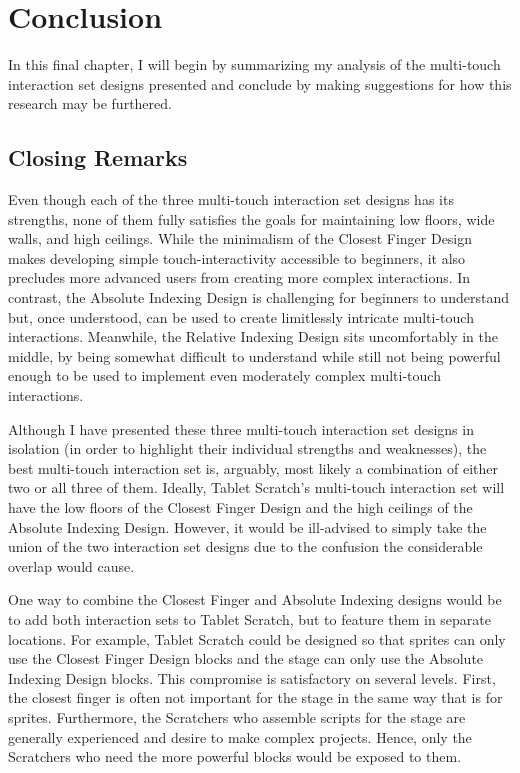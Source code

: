 \chapter{Conclusion}

In this final chapter, I will begin by summarizing my analysis of the multi-touch interaction set designs presented and conclude by making suggestions for how this research may be furthered.

\section{Closing Remarks}

Even though each of the three multi-touch interaction set designs has its strengths, none of them fully satisfies the goals for maintaining low floors, wide walls, and high ceilings. While the minimalism of the Closest Finger Design  makes developing simple touch-interactivity accessible to beginners, it also precludes more advanced users from creating more complex interactions. In contrast, the Absolute Indexing Design is challenging for beginners to understand but, once understood, can be used to create limitlessly intricate multi-touch interactions. Meanwhile, the Relative Indexing Design sits uncomfortably in the middle, by being somewhat difficult to understand while still not being powerful enough to be used to implement even moderately complex multi-touch interactions.

Although I have presented these three multi-touch interaction set designs in isolation (in order to highlight their individual strengths and weaknesses), the best multi-touch interaction set is, arguably, most likely a combination of either two or all three of them. Ideally, Tablet Scratch's multi-touch interaction set will have the low floors of the Closest Finger Design and the high ceilings of the Absolute Indexing Design. However, it would be ill-advised to simply take the union of the two interaction set designs due to the confusion the considerable overlap would cause.

One way to combine the Closest Finger and Absolute Indexing designs would be to add both interaction sets to Tablet Scratch, but to feature them in separate locations. For example, Tablet Scratch could be designed so that sprites can only use the Closest Finger Design blocks and the stage can only use the Absolute Indexing Design blocks. This compromise is satisfactory on several levels. First, the closest finger is often not important for the stage in the same way that is for sprites. Furthermore, the Scratchers who assemble scripts for the stage are generally experienced and desire to make complex projects. Hence, only the Scratchers who need the more powerful blocks would be exposed to them.

